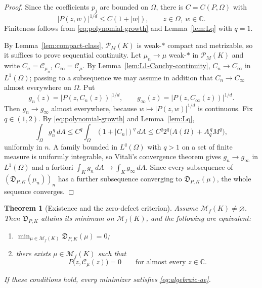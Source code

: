 \documentclass[10pt,a4paper]{amsart}
\newtheorem{theorem}{Theorem}[section]
\newcommand{\bC}{\mathbb C}
\newcommand{\M}{\mathcal M}
\newcommand{\Cauchy}{\mathcal C}
\begin{document}
\begin{proof}
Since the coefficients $p_j$ are bounded on $\Omega$, there is $C=C(P,\Omega)$
with
\begin{equation}\label{eq:polynomial-growth}
 |P(z,w)|^{1/d}\leq C(1+|w|),
 \qquad z\in\Omega,\ w\in\bC .
\end{equation}
Finiteness follows from \eqref{eq:polynomial-growth} and
Lemma~\ref{lem:Lq} with $q=1$.

By Lemma~\ref{lem:compact-class}, $\mathcal P_M(K)$ is weak-$*$ compact and
metrizable, so it suffices to prove sequential continuity.  Let
$\mu_n\to\mu$ weak-$*$ in $\mathcal P_M(K)$ and write $C_n=\Cauchy_{\mu_n}$,
$C_\infty=\Cauchy_\mu$.  By Lemma~\ref{lem:L1-Cauchy-continuity},
$C_n\to C_\infty$ in $L^1(\Omega)$; passing to a subsequence we may assume in
addition that $C_n\to C_\infty$ almost everywhere on $\Omega$.  Put
\[
 g_n(z)=\bigl|P(z,C_n(z))\bigr|^{1/d},
 \qquad
 g_\infty(z)=\bigl|P(z,C_\infty(z))\bigr|^{1/d} .
\]
Then $g_n\to g_\infty$ almost everywhere, because $w\mapsto|P(z,w)|^{1/d}$ is
continuous.  Fix $q\in(1,2)$.  By \eqref{eq:polynomial-growth} and
Lemma~\ref{lem:Lq},
\[
 \int_\Omega g_n^{\,q}\,dA
 \leq C^q\int_\Omega(1+|C_n|)^{q}\,dA
 \leq C^q2^{q}\bigl(A(\Omega)+A_q^{\,q}M^{q}\bigr),
\]
uniformly in $n$.  A family bounded in $L^q(\Omega)$ with $q>1$ on a set of
finite measure is uniformly integrable, so Vitali's convergence theorem gives
$g_n\to g_\infty$ in $L^1(\Omega)$ and a fortiori
$\int_Kg_n\,dA\to\int_Kg_\infty\,dA$.  Since every subsequence of
$(\mathfrak D_{P,K}(\mu_n))_n$ has a further subsequence converging to
$\mathfrak D_{P,K}(\mu)$, the whole sequence converges.
\end{proof}

\begin{theorem}[Existence and the zero-defect criterion]
\label{thm:main-defect}
Assume $\M_f(K)\neq\varnothing$.  Then $\mathfrak D_{P,K}$ attains its minimum
on $\M_f(K)$, and the following are equivalent:
\begin{enumerate}[label=\textup{(\roman*)}]
\item $\min_{\mu\in\M_f(K)}\mathfrak D_{P,K}(\mu)=0$;
\item there exists $\mu\in\M_f(K)$ such that
\begin{equation}\label{eq:algebraic-ae}
 P\bigl(z,\Cauchy_\mu(z)\bigr)=0
 \qquad\text{for almost every }z\in\bC .
\end{equation}
\end{enumerate}
If these conditions hold, every minimizer satisfies \eqref{eq:algebraic-ae}.
\end{theorem}
\end{document}
